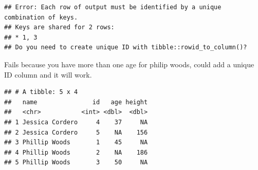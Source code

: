 \documentclass[]{book}
\newenvironment{Shaded}{\begin{snugshade}}{\end{snugshade}}
\newcommand{\CommentTok}[1]{\textcolor[rgb]{0.56,0.35,0.01}{\textit{#1}}}
\newcommand{\DataTypeTok}[1]{\textcolor[rgb]{0.13,0.29,0.53}{#1}}
\newcommand{\DecValTok}[1]{\textcolor[rgb]{0.00,0.00,0.81}{#1}}
\newcommand{\KeywordTok}[1]{\textcolor[rgb]{0.13,0.29,0.53}{\textbf{#1}}}
\newcommand{\NormalTok}[1]{#1}
\newcommand{\OperatorTok}[1]{\textcolor[rgb]{0.81,0.36,0.00}{\textbf{#1}}}
\newcommand{\StringTok}[1]{\textcolor[rgb]{0.31,0.60,0.02}{#1}}
\theoremstyle{definition}
\theoremstyle{definition}
\theoremstyle{definition}
\theoremstyle{remark}
\begin{document}
\begin{Shaded}
\end{Shaded}

\begin{verbatim}
## Error: Each row of output must be identified by a unique combination of keys.
## Keys are shared for 2 rows:
## * 1, 3
## Do you need to create unique ID with tibble::rowid_to_column()?
\end{verbatim}

Fails because you have more than one age for philip woods, could add a
unique ID column and it will work.

\begin{Shaded}
\end{Shaded}

\begin{verbatim}
## # A tibble: 5 x 4
##   name               id   age height
##   <chr>           <int> <dbl>  <dbl>
## 1 Jessica Cordero     4    37     NA
## 2 Jessica Cordero     5    NA    156
## 3 Phillip Woods       1    45     NA
## 4 Phillip Woods       2    NA    186
## 5 Phillip Woods       3    50     NA
\end{verbatim}
\end{document}

